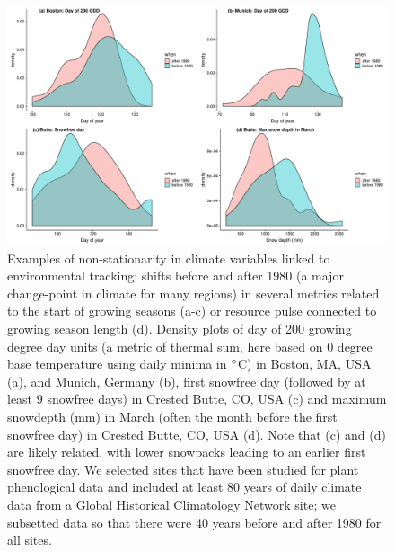 \documentclass[11pt,letterpaper]{article}
\begin{document}
\clearpage

\begin{figure}[t!]
\centering
\includegraphics[width=1\textwidth]{..//..//..//R/graphs/otherdat/climdata.pdf}
\caption{Examples of non-stationarity in climate variables linked to environmental tracking: shifts before and after 1980 (a major change-point in climate for many regions) in several metrics related to the start of growing seasons (a-c) or resource pulse connected to growing season length (d). Density plots of day of 200 growing degree day units (a metric of thermal sum, here based on 0 degree base temperature using daily minima in $\degree$C) in Boston, MA, USA (a), and Munich, Germany (b), first snowfree day (followed by at least 9 snowfree days) in Crested Butte, CO, USA (c) and maximum snowdepth (mm) in March (often the month before the first snowfree day) in Crested Butte, CO, USA (d). Note that (c) and (d) are likely related, with lower snowpacks leading to an earlier first snowfree day. We selected sites that have been studied for plant phenological data and included at least 80 years of daily climate data from a Global Historical Climatology Network site; we subsetted data so that there were 40 years before and after 1980 for all sites.} %
 \label{fig:climdat}
\end{figure}
\end{document}
